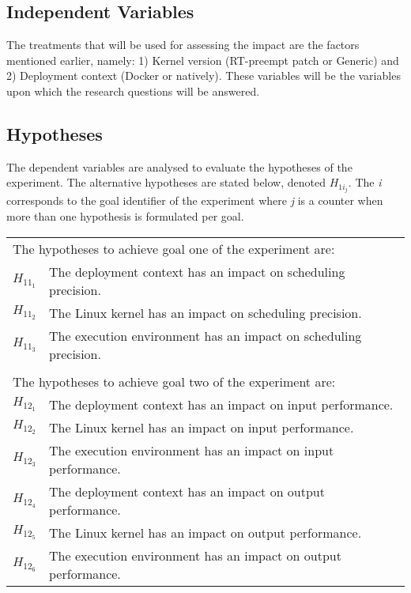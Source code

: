 \subsection{Independent Variables}
The treatments that will be used for assessing the impact are the factors mentioned earlier, namely: 1) Kernel version (RT-preempt patch or Generic) and 2) Deployment context (Docker or natively). These variables will be the variables upon which the research questions will be answered.


\subsection{Hypotheses}
The dependent variables are analysed to evaluate the hypotheses of the experiment. The alternative hypotheses are stated below, denoted $H_{1i_{j}}$. The \textit{i} corresponds to the goal identifier of the experiment where \textit{j} is a counter when more than one hypothesis is formulated per goal.  

\begin{table}[ht]
\begin{tabular}{l|l}
\multicolumn{2}{l}{The hypotheses to achieve goal one of the experiment are:} \\
$H_{11_{1}}$ & The deployment context has an impact on scheduling precision. \\
$H_{11_{2}}$ & The Linux kernel has an impact on scheduling precision. \\
$H_{11_{3}}$ & The execution environment has an impact on scheduling precision. \\          
\multicolumn{2}{l}{} \\
\multicolumn{2}{l}{The hypotheses to achieve goal two of the experiment are:} \\
$H_{12_{1}}$ & The deployment context has an impact on input performance.\\
$H_{12_{2}}$ & The Linux kernel has an impact on input performance.\\
$H_{12_{3}}$ & The execution environment has an impact on input performance.\\
$H_{12_{4}}$ & The deployment context has an impact on output performance.\\
$H_{12_{5}}$ & The Linux kernel has an impact on output performance.\\
$H_{12_{6}}$ & The execution environment has an impact on output performance.                                                          
\end{tabular}
\end{table}


